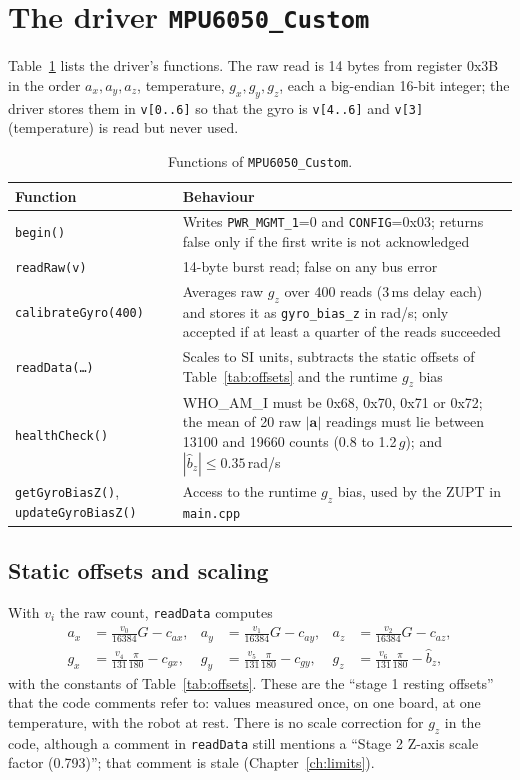 \documentclass[11pt,a4paper]{report}
\newcommand{\code}[1]{\texttt{#1}}
\begin{document}
\section{The driver \texttt{MPU6050\_Custom}}
Table~\ref{tab:driver} lists the driver's functions. The raw read is 14 bytes from register 0x3B in the order $a_x,a_y,a_z$, temperature, $g_x,g_y,g_z$, each a big-endian 16-bit integer; the driver stores them in \code{v[0..6]} so that the gyro is \code{v[4..6]} and \code{v[3]} (temperature) is read but never used.

\begin{table}[H]
\centering
\caption{Functions of \code{MPU6050\_Custom}.}\label{tab:driver}
\small
\begin{tabular}{@{}lp{10.4cm}@{}}
\toprule
Function & Behaviour\\
\midrule
\code{begin()} & Writes \code{PWR\_MGMT\_1}=0 and \code{CONFIG}=0x03; returns false only if the first write is not acknowledged\\
\code{readRaw(v)} & 14-byte burst read; false on any bus error\\
\code{calibrateGyro(400)} & Averages raw $g_z$ over 400 reads (3\,ms delay each) and stores it as \code{gyro\_bias\_z} in rad/s; only accepted if at least a quarter of the reads succeeded\\
\code{readData(\dots)} & Scales to SI units, subtracts the static offsets of Table~\ref{tab:offsets} and the runtime $g_z$ bias\\
\code{healthCheck()} & WHO\_AM\_I must be 0x68, 0x70, 0x71 or 0x72; the mean of 20 raw $|\mathbf a|$ readings must lie between 13100 and 19660 counts (0.8 to 1.2\,$g$); and $|\hat b_z|\le0.35$\,rad/s\\
\code{getGyroBiasZ()}, \code{updateGyroBiasZ()} & Access to the runtime $g_z$ bias, used by the ZUPT in \code{main.cpp}\\
\bottomrule
\end{tabular}
\end{table}

\subsection{Static offsets and scaling}
With $v_i$ the raw count, \code{readData} computes
\begin{align}
  a_x&=\tfrac{v_0}{16384}G-c_{ax}, & a_y&=\tfrac{v_1}{16384}G-c_{ay}, & a_z&=\tfrac{v_2}{16384}G-c_{az},\\
  g_x&=\tfrac{v_4}{131}\tfrac{\pi}{180}-c_{gx}, & g_y&=\tfrac{v_5}{131}\tfrac{\pi}{180}-c_{gy}, & g_z&=\tfrac{v_6}{131}\tfrac{\pi}{180}-\hat b_z, \label{eq:readdata}
\end{align}
with the constants of Table~\ref{tab:offsets}. These are the ``stage 1 resting offsets'' that the code comments refer to: values measured once, on one board, at one temperature, with the robot at rest. There is no scale correction for $g_z$ in the code, although a comment in \code{readData} still mentions a ``Stage 2 Z-axis scale factor (0.793)''; that comment is stale (Chapter~\ref{ch:limits}).
\end{document}
